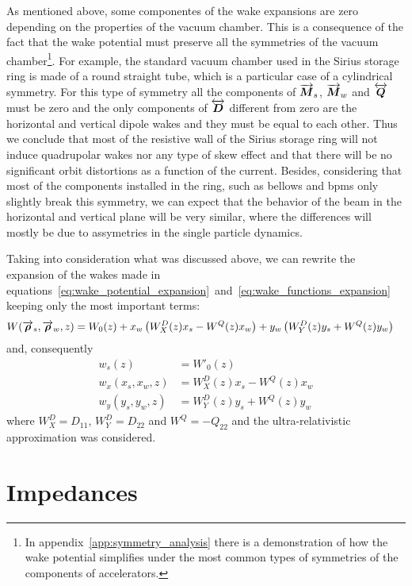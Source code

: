     As mentioned above, some componentes of the wake expansions are zero depending on the properties of the vacuum chamber. This is a consequence of the fact that the wake potential must preserve all the symmetries of the vacuum chamber\footnote{In appendix~\ref{app:symmetry_analysis} there is a demonstration of how the wake potential simplifies under the most common types of symmetries of the components of accelerators.}. For example, the standard vacuum chamber used in the Sirius storage ring is made of a round straight tube, which is a particular case of a cylindrical symmetry. For this type of symmetry all the components of $\overrightarrow{\boldsymbol{M}}_s$, $\overrightarrow{\boldsymbol{M}}_w$ and $\overleftrightarrow{\boldsymbol{Q}}$ must be zero and the only components of $\overleftrightarrow{\boldsymbol{D}}$ different from zero are the horizontal and vertical dipole wakes and they must be equal to each other. Thus we conclude that most of the resistive wall of the Sirius storage ring will not induce quadrupolar wakes nor any type of skew effect and that there will be no significant orbit distortions as a function of the current. Besides, considering that most of the components installed in the ring, such as bellows and \gls{bpms} only slightly break this symmetry, we can expect that the behavior of the beam in the horizontal and vertical plane will be very similar, where the differences will mostly be due to assymetries in the single particle dynamics.

    Taking into consideration what was discussed above, we can rewrite the expansion of the wakes made in equations~\eqref{eq:wake_potential_expansion}~and~\eqref{eq:wake_functions_expansion} keeping only the most important terms:
    \begin{align}\label{eq:important_wake_potential}
  	  	W(\overrightarrow{\boldsymbol{\rho}}_s, \overrightarrow{\boldsymbol{\rho}}_w, z) &=
	  		W_0(z) +
			x_w\left(W^D_X(z)x_s - W^Q(z)x_w\right) +
			y_w\left(W^D_Y(z)y_s + W^Q(z)y_w\right)
    \end{align}
    and, consequently
    \begin{align}\label{eq:important_wakes}\nonumber
  		w_s(z) &= W'_0(z) \\
		w_x(x_s, x_w, z) &= W^D_X(z)x_s - W^Q(z)x_w \\\nonumber
		w_y(y_s, y_w, z) &= W^D_Y(z)y_s + W^Q(z)y_w
    \end{align}
    where $W^D_X = D_{11}$, $W^D_Y = D_{22}$ and $W^Q = -Q_{22}$ and the ultra-relativistic approximation was considered.

\section{Impedances}\label{sec:impedances}

